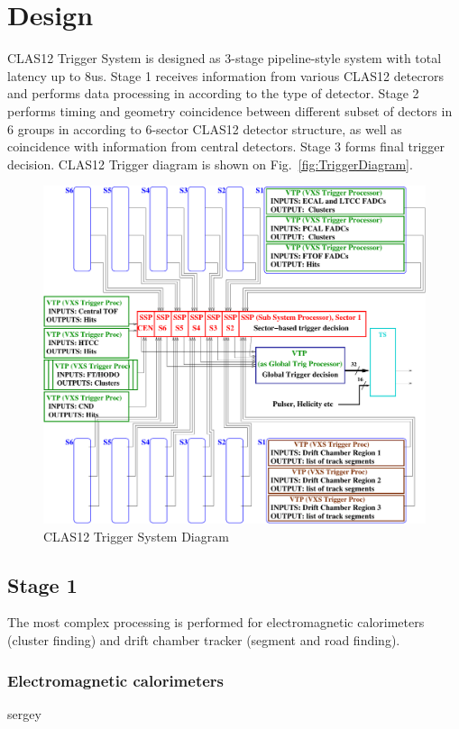 \section{Design}

CLAS12 Trigger System is designed as 3-stage pipeline-style system with total latency up to 8us. Stage 1 receives information from various CLAS12 detecrors and performs data processing in according to the type of detector. Stage 2 performs timing and geometry coincidence between different subset of dectors in 6 groups in according to 6-sector CLAS12 detector structure, as well as coincidence with information from central detectors. Stage 3 forms final trigger decision.
CLAS12 Trigger diagram is shown on Fig.~\ref{fig:TriggerDiagram}.

\begin{figure}[hbt]
	\centering
	\includegraphics[width=1.0\columnwidth,keepaspectratio]{img/CLAS12_TRIGGER_1.pdf}
	\caption{CLAS12 Trigger System Diagram}
	\label{fig:TtiggerDiagram}
\end{figure}


\subsection{Stage 1} The most complex processing is performed for electromagnetic calorimeters (cluster finding) and drift chamber tracker (segment and road finding).

\subsubsection{Electromagnetic calorimeters} sergey

